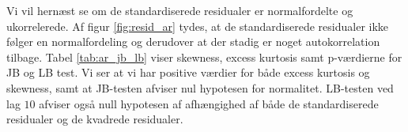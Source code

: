 Vi vil hernæst se om de standardiserede residualer er normalfordelte og ukorrelerede.
Af figur \ref{fig:resid_ar} tydes, at de standardiserede residualer ikke følger en normalfordeling og derudover at der stadig er noget autokorrelation tilbage. 
Tabel \ref{tab:ar_jb_lb} viser skewness, excess kurtosis samt p-værdierne for JB og LB test. 
Vi ser at vi har positive værdier for både excess kurtosis og skewness, samt at JB-testen afviser nul hypotesen for normalitet. 
LB-testen ved lag $10$ afviser også null hypotesen af afhængighed af både de standardiserede residualer og de kvadrede residualer. 




